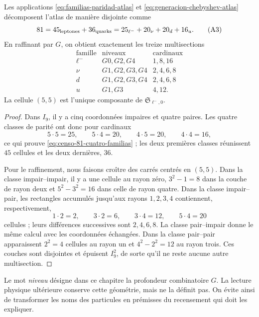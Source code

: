 \begin{theorem}
\label{thm:censo-atlas-81}
Les applications \eqref{eq:familias-paridad-atlas} et
\eqref{eq:generacion-chebyshev-atlas} décomposent l'atlas de manière
disjointe comme
\[
 81=45_{\rm leptones}+36_{\rm quarks}
   =25_{\ell^-}+20_{\nu}+20_{d}+16_{u}.
 \tag{A3}\label{eq:censo-81-cuatro-familias}
\]
En raffinant par \(G\), on obtient exactement les treize multisections
\[
\begin{array}{c|c|c}
\text{famille}&\text{niveaux}&\text{cardinaux}\\ \hline
\ell^-&G0,G2,G4&1,8,16\\
\nu&G1,G2,G3,G4&2,4,6,8\\
d&G1,G2,G3,G4&2,4,6,8\\
u&G1,G3&4,12.
\end{array}
\tag{A4}\label{eq:trece-multisecciones-atlas}
\]
La cellule \((5,5)\) est l'unique composante de
\(\mathfrak S_{\ell^-,0}\).
\end{theorem}

\begin{proof}
Dans \(I_9\), il y a cinq coordonnées impaires et quatre paires. Les quatre classes
de parité ont donc pour cardinaux
\[
 5\cdot5=25,\qquad
 5\cdot4=20,\qquad
 4\cdot5=20,\qquad
 4\cdot4=16,
\]
ce qui prouve \eqref{eq:censo-81-cuatro-familias} ; les deux premières
classes réunissent \(45\) cellules et les deux dernières, \(36\).

Pour le raffinement, nous faisons croître des carrés centrés en \((5,5)\).
Dans la classe impair--impair, il y a une cellule au rayon zéro, \(3^2-1=8\)
dans la couche de rayon deux et \(5^2-3^2=16\) dans celle de rayon quatre.
Dans la classe impair--pair, les rectangles accumulés jusqu'aux rayons
\(1,2,3,4\) contiennent, respectivement,
\[
 1\cdot2=2,\qquad 3\cdot2=6,\qquad
 3\cdot4=12,\qquad5\cdot4=20
\]
cellules ; leurs différences successives sont \(2,4,6,8\). La classe
pair--impair donne le même calcul avec les coordonnées échangées. Dans la
classe pair--pair apparaissent \(2^2=4\) cellules au rayon un et
\(4^2-2^2=12\) au rayon trois. Ces couches sont disjointes et épuisent
\(I_9^2\), de sorte qu'il ne reste aucune autre multisection.
\end{proof}

Le mot \emph{niveau} désigne dans ce chapitre la profondeur combinatoire
\(G\). La lecture physique ultérieure conserve cette géométrie, mais ne la
définit pas. On évite ainsi de transformer les noms des particules en prémisses
du recensement qui doit les expliquer.

